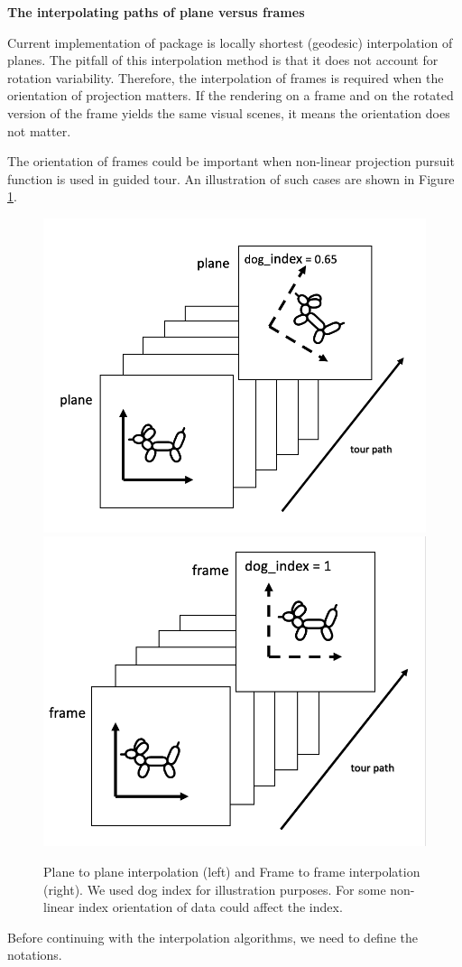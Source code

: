 \textbf{The interpolating paths of plane versus frames}

Current implementation of  package is locally shortest (geodesic) interpolation of planes. The pitfall of this interpolation method is that it does not account for rotation variability. Therefore, the interpolation of frames is required when the orientation of projection matters. If the rendering on a frame and on the rotated version of the frame yields the same visual scenes, it means the orientation does not matter.

The orientation of frames could be important when non-linear projection pursuit function is used in guided tour. An illustration of such cases are shown in Figure \ref{fig:dogs}.

\begin{figure}

{\centering \includegraphics[width=0.5\linewidth]{plane} \includegraphics[width=0.5\linewidth]{frame} 

}

\caption{Plane to plane interpolation (left) and Frame to frame interpolation (right). We used dog index for illustration purposes. For some non-linear index orientation of data could affect the index.}\label{fig:dogs}
\end{figure}

Before continuing with the interpolation algorithms, we need to define the notations.

